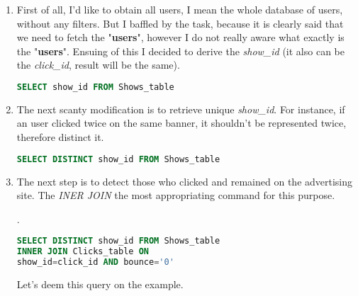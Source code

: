\documentclass[14pt, a4paper]{extarticle}
\begin{document}
\begin{enumerate}
\item First of all, I'd like to obtain all users, I mean the whole database of
users, without any filters. But I baffled by the task, because it is clearly 
said that we need to fetch the "\textbf{users}", however I do not really aware 
what exactly is the "\textbf{users}". Ensuing of this I decided to derive the 
\emph{show\_id} (it also can be the \emph{click\_id}, result will be the same).

\begin{lstlisting}[language=SQL]
SELECT show_id FROM Shows_table
\end{lstlisting}

\item The next scanty modification is to retrieve unique \emph{show\_id}. 
For instance, if an user clicked twice on the same banner, it shouldn't be represented
twice, therefore distinct it. 

\begin{lstlisting}[language=SQL]
SELECT DISTINCT show_id FROM Shows_table
\end{lstlisting}

\item The next step is to detect those who clicked and remained on the advertising site.
The \emph{INER JOIN} the most appropriating command for this purpose.

.

\begin{lstlisting}[language=SQL]
SELECT DISTINCT show_id FROM Shows_table
INNER JOIN Clicks_table ON
show_id=click_id AND bounce='0' 
\end{lstlisting}
Let's deem this query on the example.



\end{enumerate}
\end{document}

